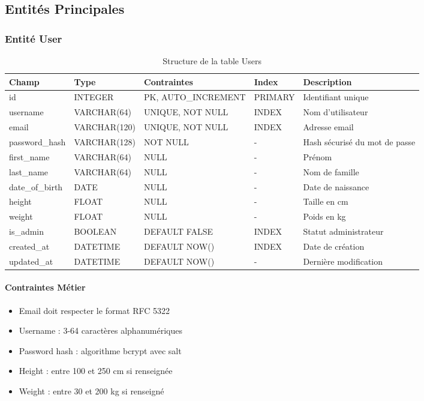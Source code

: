 \subsection{Entités Principales}

\subsubsection{Entité User}

\begin{table}[H]
\centering
\begin{tabular}{|l|l|l|l|p{4cm}|}
\hline
\textbf{Champ} & \textbf{Type} & \textbf{Contraintes} & \textbf{Index} & \textbf{Description} \\
\hline
id & INTEGER & PK, AUTO\_INCREMENT & PRIMARY & Identifiant unique \\
username & VARCHAR(64) & UNIQUE, NOT NULL & INDEX & Nom d'utilisateur \\
email & VARCHAR(120) & UNIQUE, NOT NULL & INDEX & Adresse email \\
password\_hash & VARCHAR(128) & NOT NULL & - & Hash sécurisé du mot de passe \\
first\_name & VARCHAR(64) & NULL & - & Prénom \\
last\_name & VARCHAR(64) & NULL & - & Nom de famille \\
date\_of\_birth & DATE & NULL & - & Date de naissance \\
height & FLOAT & NULL & - & Taille en cm \\
weight & FLOAT & NULL & - & Poids en kg \\
is\_admin & BOOLEAN & DEFAULT FALSE & INDEX & Statut administrateur \\
created\_at & DATETIME & DEFAULT NOW() & INDEX & Date de création \\
updated\_at & DATETIME & DEFAULT NOW() & - & Dernière modification \\
\hline
\end{tabular}
\caption{Structure de la table Users}
\end{table}

\paragraph{Contraintes Métier}
\begin{itemize}
    \item Email doit respecter le format RFC 5322
    \item Username : 3-64 caractères alphanumériques
    \item Password hash : algorithme bcrypt avec salt
    \item Height : entre 100 et 250 cm si renseignée
    \item Weight : entre 30 et 200 kg si renseigné
\end{itemize}

